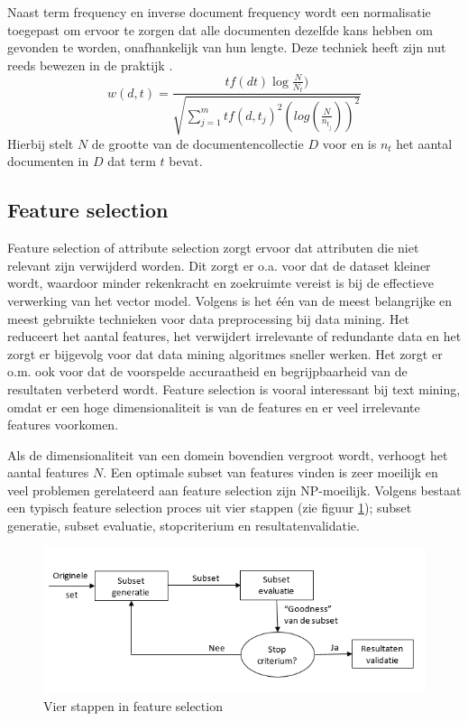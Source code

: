 Naast term frequency en inverse document frequency wordt een normalisatie toegepast om ervoor te zorgen dat alle documenten dezelfde kans hebben om gevonden te worden, onafhankelijk van hun lengte. Deze techniek heeft zijn nut reeds bewezen in de praktijk . 
\begin{equation}\label{eq:tfidf}
w(d,t) = \frac{tf(dt)\log{\frac{N}{N_t}})}{\sqrt{\sum_{j=1}^{m}tf(d,t_j)^2(log(\frac{N}{n_{t_j}}))^2}}
\end{equation}
Hierbij stelt $N$ de grootte van de documentencollectie $D$ voor en is $n_t$ het aantal documenten in $D$ dat term $t$ bevat.

\subsection{Feature selection}
Feature selection of attribute selection zorgt ervoor dat attributen die niet relevant zijn verwijderd worden. Dit zorgt er o.a. voor dat de dataset kleiner wordt, waardoor minder rekenkracht en zoekruimte vereist is bij de effectieve verwerking van het vector model. Volgens \cite{Liu2005} is het \'e\'en van de meest belangrijke en meest gebruikte technieken voor data preprocessing bij data mining. Het reduceert het aantal features, het verwijdert irrelevante of redundante data en het zorgt er bijgevolg voor dat data mining algoritmes sneller werken. Het zorgt er o.m. ook voor dat de voorspelde accuraatheid en begrijpbaarheid van de resultaten verbeterd wordt. Feature selection is vooral interessant bij text mining, omdat er een hoge dimensionaliteit is van de features en er veel irrelevante features voorkomen.

Als de dimensionaliteit van een domein bovendien vergroot wordt, verhoogt het aantal features $N$. Een optimale subset van features vinden is zeer moeilijk en veel problemen gerelateerd aan feature selection zijn NP-moeilijk. Volgens \cite{Liu2005} bestaat een typisch feature selection proces uit vier stappen (zie figuur \ref{fig:feature-selection}); subset generatie, subset evaluatie, stopcriterium en resultatenvalidatie.

\begin{figure}[h]
	\caption{Vier stappen in feature selection}
	\label{fig:feature-selection}
	\includegraphics[width=\textwidth]{fig/feature-selection}
\end{figure}

